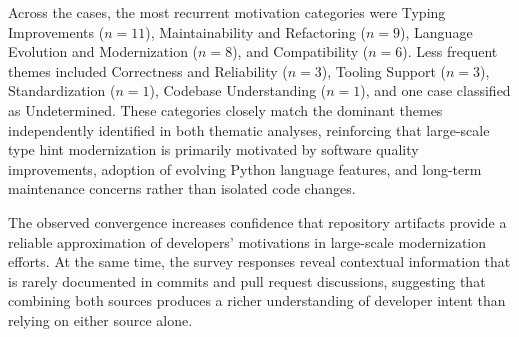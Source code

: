 Across the cases, the most recurrent motivation categories were Typing Improvements ($n=11$), Maintainability and Refactoring ($n=9$), Language Evolution and Modernization ($n=8$), and Compatibility ($n=6$). Less frequent themes included Correctness and Reliability ($n=3$), Tooling Support ($n=3$), Standardization ($n=1$), Codebase Understanding ($n=1$), and one case classified as Undetermined. These categories closely match the dominant themes independently identified in both thematic analyses, reinforcing that large-scale type hint modernization is primarily motivated by software quality improvements, adoption of evolving Python language features, and long-term maintenance concerns rather than isolated code changes.

The observed convergence increases confidence that repository artifacts provide a reliable approximation of developers' motivations in large-scale modernization efforts. At the same time, the survey responses reveal contextual information that is rarely documented in commits and pull request discussions, suggesting that combining both sources produces a richer understanding of developer intent than relying on either source alone.




